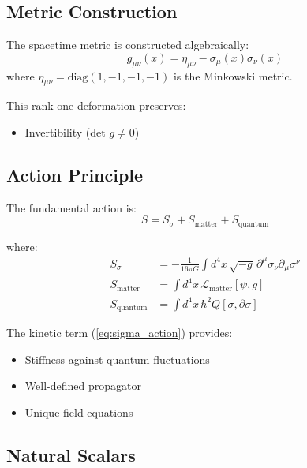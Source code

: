 \documentclass[11pt,a4paper]{article}
\theoremstyle{definition}
\theoremstyle{remark}
\begin{document}
	\subsection{Metric Construction}
	
		The spacetime metric is constructed algebraically:
		\begin{equation}\label{eq:metric_fundamental}
			\boxed{g_{\mu\nu}(x) = \eta_{\mu\nu} - \sigma_\mu(x)\sigma_\nu(x)}
		\end{equation}
		where $\eta_{\mu\nu} = \mathrm{diag}(1,-1,-1,-1)$ is the Minkowski metric.
	
	This rank-one deformation preserves:
	\begin{itemize}
		\item Invertibility (det $g \neq 0$)
	\end{itemize}
	
	\subsection{Action Principle}
	
	The fundamental action is:
	\begin{equation}\label{eq:action_qgd}
		S = S_\sigma + S_{\text{matter}} + S_{\text{quantum}}
	\end{equation}
	
	where:
	\begin{align}
		S_\sigma &= -\frac{1}{16\pi G}\int d^4x\, \sqrt{-g}\, \partial^\mu\sigma_\nu\partial_\mu\sigma^\nu \label{eq:sigma_action}\\
		S_{\text{matter}} &= \int d^4x\, \mathcal{L}_{\text{matter}}[\psi, g] \label{eq:matter_action}\\
		S_{\text{quantum}} &= \int d^4x\, \hbar^2 Q[\sigma, \partial\sigma] \label{eq:quantum_action}
	\end{align}
	
	The kinetic term (\ref{eq:sigma_action}) provides:
	\begin{itemize}
		\item Stiffness against quantum fluctuations
		\item Well-defined propagator
		\item Unique field equations
	\end{itemize}
	
	\subsection{Natural Scalars}
	
\end{document}

